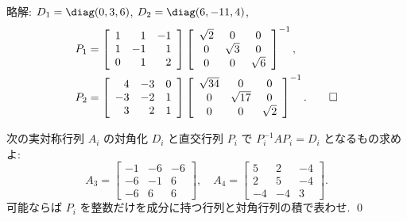 \documentclass[12pt,twoside]{jarticle}
\newcommand\commentout[1]{#1}
\newcommand\commentout[1]{}
\begin{document}
\commentout{
\noindent
略解: $D_1=\diag(0,3,6)$, $D_2=\diag(6,-11,4)$, 
\begin{align*}
  &
  P_1 = 
  \left[ 
    \begin{array}{rrr}
      1 & 1 & -1 \\
      1 & -1 & 1 \\
      0 & 1 & 2
    \end{array}
  \right]
  \left[ 
    \begin{array}{ccc}
      \sqrt {2} & 0 & 0 \\
      0 & \sqrt {3} & 0 \\
      0 & 0 & \sqrt {6}
    \end{array}
  \right]^{-1},
  \\ &
  P_2 =
  \left[ 
    \begin{array}{rrr}
      4 & -3 & 0 \\
      -3 & -2 & 1 \\
      3 & 2 & 1
    \end{array}
  \right]
  \left[ 
    \begin{array}{ccc}
      \sqrt {34} & 0 & 0 \\
      0 & \sqrt {17} & 0 \\
      0 & 0 & \sqrt {2}
    \end{array}
  \right]^{-1}.
  \qed
\end{align*}
}


\begin{question}
\label{q:ars-2}
  次の実対称行列 $A_i$ の対角化 $D_i$ と直交行列 $P_i$ で $P_i^{-1}AP_i=D_i$ 
  となるもの求めよ:
  \begin{equation*}
    A_3 = \left[ 
      \begin{array}{rrr}
        -1 & -6 & -6 \\
        -6 & -1 & 6 \\
        -6 & 6 & 6
      \end{array}
    \right],
    \quad
    A_4 = \left[ 
      \begin{array}{rrr}
        5 & 2 & -4 \\
        2 & 5 & -4 \\
        -4 & -4 & 3
      \end{array}
    \right].
  \end{equation*}
  可能ならば $P_i$ を整数だけを成分に持つ行列と対角行列の積で表わせ.
  \qed
\end{question}
\end{document}
